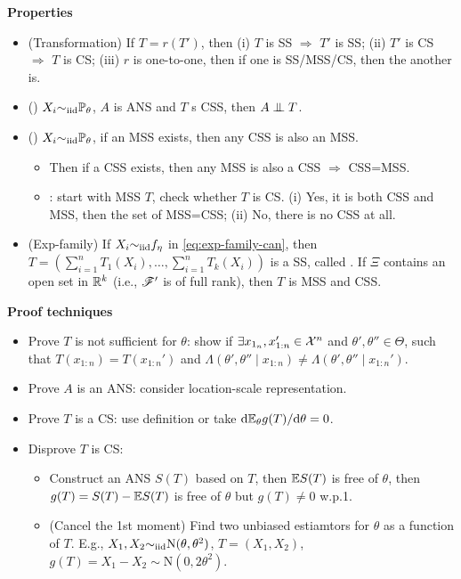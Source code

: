 \documentclass[10pt,a4paper]{book}
\begin{document}
\noindent\textbf{Properties}
\begin{itemize}
	\item (Transformation) If $T=r(T')$, then (i) $T$ is SS $\Rightarrow$ $T'$ is SS; (ii) $T'$ is CS $\Rightarrow$ $T$ is CS; (iii) $r$ is one-to-one, then if one is SS/MSS/CS, then the another is.    
	\item () $X_i{\sim}_{\mathrm{iid}}\mathbb P_\theta$, $A$ is ANS and $T$ s CSS, then $A \indep T$.
	\item () $X_i{\sim}_{\mathrm{iid}}\mathbb P_\theta$, if an MSS exists, then any CSS is also an MSS.
	\begin{itemize}
		\item Then if a CSS exists, then any MSS is also a CSS $\Rightarrow$ CSS=MSS.
		\item {}: start with MSS $T$, check whether $T$ is CS. (i) Yes, it is both CSS and MSS, then the set of MSS=CSS; (ii) No, there is no CSS at all.  
	\end{itemize}
	\item (Exp-family) If $X_i{\sim}_{\mathrm{iid}} f_{\eta}$ in \eqref{eq:exp-family-can}, then $T=(\sum_{i=1}^nT_1(X_i),\ldots,\sum_{i=1}^nT_k(X_i))$ is a SS, called . If $\Xi$ contains an open set in $\mathbb R^k$ (i.e., $\mathscr{F}'$ is of full rank), then $T$ is MSS and CSS. 
\end{itemize}

\noindent\textbf{Proof techniques}
\begin{itemize}
	\item Prove $T$ is not sufficient for $\theta$: show if $\exists x_{1_n}, x_{1:n}'\in{\cal X}^n$ and $\theta',\theta''\in\Theta$, such that $T(x_{1:n})=T(x_{1:n}')$ and $\Lambda(\theta',\theta''\mid x_{1:n})\neq \Lambda(\theta',\theta''\mid x_{1:n}')$.  
	\item Prove $A$ is an ANS: consider location-scale representation.
	\item Prove $T$ is a CS: use definition or take $\mathrm{d}\mathbb E_{\theta}g(T)/\mathrm{d}\theta=0$. 
	\item Disprove $T$ is CS: 
	\begin{itemize}
		\item Construct an ANS $S(T)$ based on $T$, then $\mathbb E S(T)$ is free of $\theta$, then $g(T)=S(T)-\mathbb E S(T)$ is free of $\theta$ but $g(T)\neq 0$ w.p.1. 
		\item (Cancel the 1st moment) Find two unbiased estiamtors for $\theta$ as a function of $T$. E.g., $X_1,X_2{\sim}_{\mathrm{iid}} \mathrm{N}(\theta,\theta^2)$, $T=(X_1,X_2)$, $g(T)=X_1-X_2\sim\mathrm{N}(0,2\theta^2)$. 
	\end{itemize}
	
\end{itemize}
\end{document}
